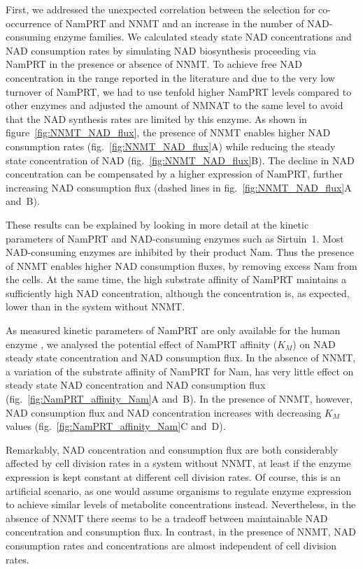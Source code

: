 First, we addressed the unexpected correlation between the selection for co-occurrence of NamPRT and NNMT and an increase in the number of NAD-consuming enzyme families. We calculated steady state NAD concentrations and NAD consumption rates by simulating NAD biosynthesis proceeding via NamPRT in the presence or absence of NNMT. To achieve free NAD concentration in the range reported in the literature and due to the very low turnover of NamPRT, we had to use tenfold higher NamPRT levels compared to other enzymes and adjusted the amount of NMNAT to the same level to avoid that the NAD synthesis rates are limited by this enzyme. As shown in figure~\ref{fig:NNMT_NAD_flux}, the presence of NNMT enables higher NAD consumption rates (fig.~\ref{fig:NNMT_NAD_flux}A) while reducing the steady state concentration of NAD (fig.~\ref{fig:NNMT_NAD_flux}B). The decline in NAD concentration can be compensated by a higher expression of NamPRT, further increasing NAD consumption flux (dashed lines in fig.~\ref{fig:NNMT_NAD_flux}A and~B).

These results can be explained by looking in more detail at the kinetic parameters of NamPRT and NAD-consuming enzymes such as Sirtuin~1. Most NAD-consuming enzymes are inhibited by their product Nam. Thus the presence of NNMT enables higher NAD consumption fluxes, by removing excess Nam from the cells. At the same time, the high substrate affinity of NamPRT maintains a sufficiently high NAD concentration, although the concentration is, as expected, lower than in the system without NNMT.

As measured kinetic parameters of NamPRT are only available for the human enzyme \cite{Burgos2008}, we analysed the potential effect of NamPRT affinity ($K_{M}$) on NAD steady state concentration and NAD consumption flux. In the absence of NNMT, a variation of the substrate affinity of NamPRT for Nam, has very little effect on steady state NAD concentration and NAD consumption flux (fig.~\ref{fig:NamPRT_affinity_Nam}A and~B). In the presence of NNMT, however, NAD consumption flux and NAD concentration increases with decreasing $K_{M}$ values (fig.~\ref{fig:NamPRT_affinity_Nam}C and~D).

Remarkably, NAD concentration and consumption flux are both considerably affected by cell division rates in a system without NNMT, at least if the enzyme expression is kept constant at different cell division rates. Of course, this is an artificial scenario, as one would assume organisms to regulate enzyme expression to achieve similar levels of metabolite concentrations instead. Nevertheless, in the absence of NNMT there seems to be a tradeoff between maintainable NAD concentration and consumption flux. In contrast, in the presence of NNMT, NAD consumption rates and concentrations are almost independent of cell division rates.

